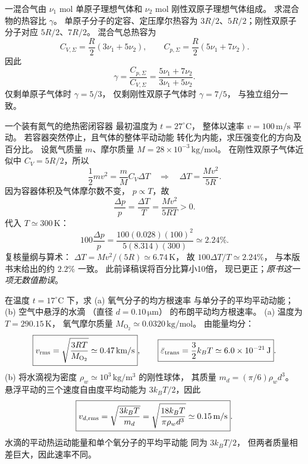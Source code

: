 一混合气由 $\nu_1$ mol 单原子理想气体和
$\nu_2$ mol 刚性双原子理想气体组成。
求混合物的热容比 $\gamma$。
\exsolution
单原子分子的定容、定压摩尔热容为
$3R/2$、$5R/2$；刚性双原子分子对应
$5R/2$、$7R/2$。
混合气总热容为
\[
C_{V,\Sigma}=\frac R2(3\nu_1+5\nu_2),\qquad
C_{p,\Sigma}=\frac R2(5\nu_1+7\nu_2).
\]
因此
\[
\boxed{\gamma=
\frac{C_{p,\Sigma}}{C_{V,\Sigma}}
=\frac{5\nu_1+7\nu_2}{3\nu_1+5\nu_2}}.
\]
\excheck 仅剩单原子气体时 $\gamma=5/3$，
仅剩刚性双原子气体时 $\gamma=7/5$，
与独立组分一致。

一个装有氮气的绝热密闭容器
最初温度为 $t=27^\circ\mathrm C$，
整体以速率 $v=100\,\mathrm{m/s}$ 平动。
若容器突然停止，且气体的整体平动动能
转化为内能，求压强变化的方向及百分比。
\exsolution
设氮气质量 $m$、摩尔质量
$M=28\times10^{-3}\,\mathrm{kg/mol}$。
在刚性双原子气体近似中
$C_V=5R/2$，所以
\[
\frac12mv^2=\frac mM C_V\Delta T
\quad\Longrightarrow\quad
\Delta T=\frac{Mv^2}{5R}.
\]
因为容器体积及气体摩尔数不变，
$p\propto T$，故
\[
\boxed{\frac{\Delta p}{p}
=\frac{\Delta T}{T}
=\frac{Mv^2}{5RT}>0}.
\]
代入 $T\simeq300\,\mathrm K$：
\[
\boxed{100\frac{\Delta p}{p}
=\frac{100(0.028)(100)^2}{5(8.314)(300)}
\simeq2.24\%}.
\]
\excheck 复核量纲与算术：
$\Delta T=Mv^2/(5R)\simeq6.74\,\mathrm K$，
故 $100\Delta T/T\simeq2.24\%$，
与本版书末给出的约 $2.2\%$ 一致。
此前译稿误将百分比算小10倍，
现已更正；\emph{原书这一项无数值勘误}。

在温度 $t=17^\circ\mathrm C$ 下，求
(a) 氧气分子的均方根速率
与单分子的平均平动动能；
(b) 空气中悬浮的水滴
（直径 $d=0.10\,\mathrm{\mu m}$）
的布朗平动均方根速率。
\exsolution
(a) 温度为 $T=290.15\,\mathrm K$，
氧气摩尔质量
$M_{\mathrm O_2}\simeq0.0320\,\mathrm{kg/mol}$。
由能量均分：
\[
\boxed{v_{\rm rms}=\sqrt{\frac{3RT}{M_{\mathrm O_2}}}
\simeq0.47\,\mathrm{km/s}},\qquad
\boxed{\bar\varepsilon_{\rm trans}=\frac32k_BT
\simeq6.0\times10^{-21}\,\mathrm J}.
\]
(b) 将水滴视为密度
$\rho_w\simeq10^3\,\mathrm{kg/m^3}$
的刚性球体，
其质量
$m_d=(\pi/6)\rho_wd^3$。
悬浮平动的三个速度自由度平均动能为
$3k_BT/2$，因此
\[
\boxed{v_{d,\rm rms}=
\sqrt{\frac{3k_BT}{m_d}}
=\sqrt{\frac{18k_BT}{\pi\rho_wd^3}}
\simeq0.15\,\mathrm{m/s}}.
\]
\excheck 水滴的平动热运动能量和单个氧分子的平均平动能
同为 $3k_BT/2$，
但两者质量相差巨大，因此速率不同。

